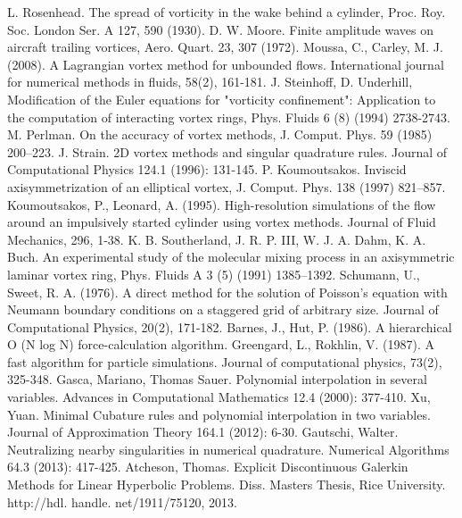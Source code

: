 \documentclass[letterpaper,12pt]{report}
\begin{document}
\begin{thebibliography}{9}
L. Rosenhead. The spread of vorticity in the wake behind a cylinder, Proc. Roy. Soc. London Ser. A 127, 590 (1930).
D. W. Moore. Finite amplitude waves on aircraft trailing vortices, Aero. Quart. 23, 307 (1972).
Moussa, C., Carley, M. J. (2008). A Lagrangian vortex method for unbounded flows. International journal for numerical methods in fluids, 58(2), 161-181.
J. Steinhoff, D. Underhill, Modification of the Euler equations for "vorticity confinement": Application to the computation of interacting vortex rings, Phys. Fluids 6 (8) (1994) 2738-2743.
M. Perlman. On the accuracy of vortex methods, J. Comput. Phys. 59 (1985) 200–223.
J. Strain. 2D vortex methods and singular quadrature rules. Journal of Computational Physics 124.1 (1996): 131-145.
P. Koumoutsakos. Inviscid axisymmetrization of an elliptical vortex, J. Comput. Phys. 138 (1997) 821–857.
Koumoutsakos, P., Leonard, A. (1995). High-resolution simulations of the flow around an impulsively started cylinder using vortex methods. Journal of Fluid Mechanics, 296, 1-38.
K. B. Southerland, J. R. P. III, W. J. A. Dahm, K. A. Buch. An experimental study of the molecular mixing process in an axisymmetric laminar vortex ring, Phys. Fluids A 3 (5) (1991) 1385–1392.
Schumann, U., Sweet, R. A. (1976). A direct method for the solution of Poisson's equation with Neumann boundary conditions on a staggered grid of arbitrary size. Journal of Computational Physics, 20(2), 171-182.
Barnes, J.,  Hut, P. (1986). A hierarchical O (N log N) force-calculation algorithm.
Greengard, L.,  Rokhlin, V. (1987). A fast algorithm for particle simulations. Journal of computational physics, 73(2), 325-348.
Gasca, Mariano, Thomas Sauer. Polynomial interpolation in several variables. Advances in Computational Mathematics 12.4 (2000): 377-410.
Xu, Yuan. Minimal Cubature rules and polynomial interpolation in two variables. Journal of Approximation Theory 164.1 (2012): 6-30.
Gautschi, Walter. Neutralizing nearby singularities in numerical quadrature. Numerical Algorithms 64.3 (2013): 417-425.
Atcheson, Thomas. Explicit Discontinuous Galerkin Methods for Linear Hyperbolic Problems. Diss. Masters Thesis, Rice University. http://hdl. handle. net/1911/75120, 2013.

\end{thebibliography}
\end{document}
